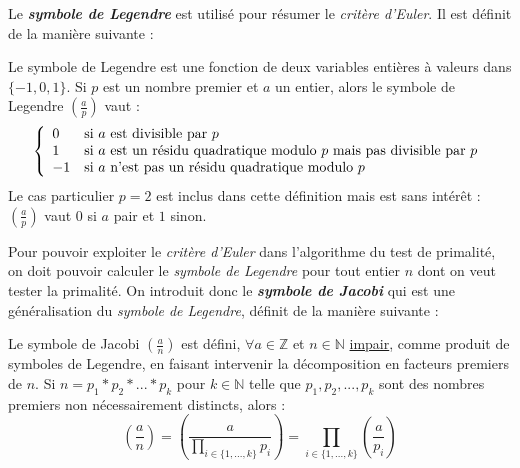 		Le \textit{\textbf{symbole de Legendre}} est utilisé pour résumer le \textit{critère d'Euler}. Il est définit de la manière suivante :
		\vspace{-1.5em}\begin{adjustwidth}{1.5cm}{1.5cm} 
		\begin{Def}
			\label{Legendre}
			Le symbole de Legendre est une fonction de deux variables entières à valeurs dans $\{-1, 0, 1\}$. Si $p$ est un nombre premier et $a$ un entier, alors le symbole de Legendre $\left ( \frac{a}{p} \right )$ vaut :
			\[
			\left\{
			\begin{array}{l l}
			0 & \text{si } a \text{ est divisible par } p\\
			1 & \text{si } a \text{ est un résidu quadratique modulo } p \text{ mais pas divisible par } p\\
			-1 & \text{si } a \text{ n'est pas un résidu quadratique modulo } p
			\end{array}
			\right.
			\]
			Le cas particulier $p = 2$ est inclus dans cette définition mais est sans intérêt : $\left ( \frac{a}{p} \right )$ vaut $0$ si $a$ pair et $1$ sinon.
		\end{Def}
		\end{adjustwidth}\vspace{0.5em}
		
		Pour pouvoir exploiter le \textit{critère d'Euler} dans l'algorithme du test de primalité, on doit pouvoir calculer le \textit{symbole de Legendre} pour tout entier $n$ dont on veut tester la primalité. On introduit donc le \textit{\textbf{symbole de Jacobi}} qui est une généralisation du \textit{symbole de Legendre}, définit de la manière suivante :
		\vspace{-1.5em}\begin{adjustwidth}{1.5cm}{1.5cm} 
		\begin{Def}
			\label{Jacobi}
			Le symbole de Jacobi $\left ( \frac{a}{n} \right )$ est défini, $\forall a \in \mathbb{Z}$ et $n \in \mathbb{N}$ \underline{impair}, comme produit de symboles de Legendre, en faisant intervenir la décomposition en facteurs premiers de $n$. Si $n = p_{1}*p_{2}*...*p_{k}$ pour $k \in \mathbb{N}$ telle que $p_{1}, p_{2}, ...,p_{k}$ sont des nombres premiers non nécessairement distincts, alors :
			\[\left ( \frac{a}{n} \right ) = \left ( \frac{a}{\prod_{i \in \{1,...,k\}} p_{i}} \right ) = \prod_{i \in \{1,...,k\}} \left ( \frac{a}{p_{i}} \right )\]
		\end{Def}
		\end{adjustwidth}\vspace{0.5em}
		
